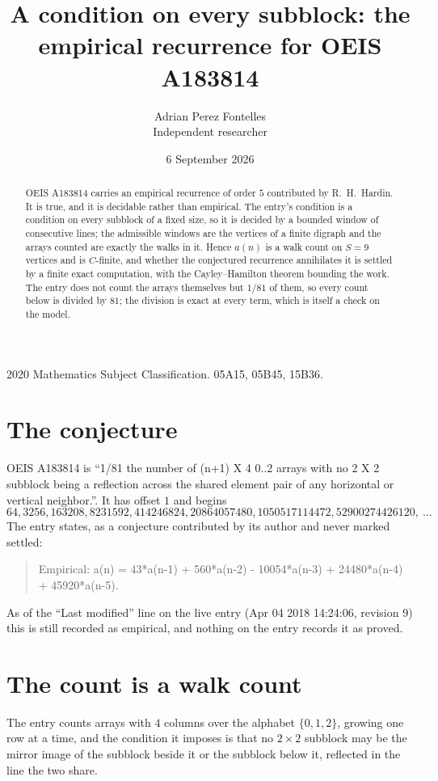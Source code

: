 \documentclass[11pt,a4paper]{article}
\title{A condition on every subblock: the empirical recurrence for OEIS A183814}
\author{Adrian Perez Fontelles\\ \small Independent researcher}
\date{6 September 2026}
\theoremstyle{plain}
\theoremstyle{definition}
\begin{document}
\maketitle

\begin{abstract}
OEIS A183814 carries an empirical recurrence of order $5$ contributed by R.~H.~Hardin. It is
true, and it is decidable rather than empirical. The entry's condition is a condition on every
subblock of a fixed size, so it is decided by a bounded window of consecutive lines; the
admissible windows are the vertices of a finite digraph and the arrays counted are exactly the
walks in it. Hence $a(n)$ is a walk count on $S=9$ vertices and is $C$-finite, and whether the
conjectured recurrence annihilates it is settled by a finite exact computation, with the
Cayley--Hamilton theorem bounding the work. The entry does not count the arrays themselves but $1/81$ of them, so every count below is divided by $81$; the division is exact at every term, which is itself a check on the model.
\end{abstract}

\noindent\small 2020 Mathematics Subject Classification. 05A15, 05B45, 15B36.\normalsize

\section{The conjecture}

OEIS A183814 is ``1/81 the number of (n+1) X 4 0..2 arrays with no 2 X 2 subblock being a reflection across the shared element pair of any horizontal or vertical neighbor.''. It has offset $1$ and begins
\[
64, 3256, 163208, 8231592, 414246824, 20864057480, 1050517114472, 52900274426120,\ \dots
\]
The entry states, as a conjecture contributed by its author and never marked settled:
\begin{quote}
Empirical: a(n) = 43*a(n-1) + 560*a(n-2) - 10054*a(n-3) + 24480*a(n-4) + 45920*a(n-5).
\end{quote}
As of the ``Last modified'' line on the live entry (Apr 04 2018 14:24:06, revision 9) this is still
recorded as empirical, and nothing on the entry records it as proved.

\section{The count is a walk count}

The entry counts arrays with $4$ columns over the alphabet $\{0,1,2\}$, growing one row at a time, and the condition it imposes is that no $2\times2$ subblock may be the mirror image of the subblock beside it or the subblock below it, reflected in the line the two share.
\end{document}
